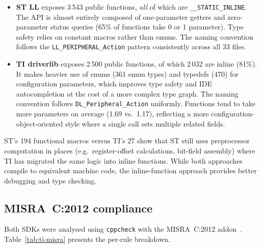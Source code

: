 \begin{itemize}
  \item \textbf{ST LL} exposes 3\,543 public functions, \emph{all} of which are
        \texttt{\_\_STATIC\_INLINE}. The API is almost entirely composed of one-parameter
        getters and zero-parameter status queries (65\% of functions take 0 or 1 parameter).
        Type safety relies on constant macros rather than enums. The naming convention
        follows the \texttt{LL\_PERIPHERAL\_Action} pattern consistently across all 33
        files.
  \item \textbf{TI driverlib} exposes 2\,500 public functions, of which 2\,032 are inline
        (81\%). It makes heavier use of enums (361 enum types) and typedefs (470) for
        configuration parameters, which improves type safety and IDE autocompletion at the
        cost of a more complex type graph. The naming convention follows
        \texttt{DL\_Peripheral\_Action} uniformly. Functions tend to take more parameters
        on average (1.69 vs.\ 1.17), reflecting a more configuration-object-oriented
        style where a single call sets multiple related fields.
\end{itemize}

ST's 194 functional macros versus TI's 27 show that ST still uses preprocessor computation
in places (e.g.\ register-offset calculations, bit-field assembly) where TI has migrated
the same logic into inline functions. While both approaches compile to equivalent machine
code, the inline-function approach provides better debugging and type checking.

\subsection{MISRA~C:2012 compliance}
\label{subsec:ti-misra}

Both SDKs were analysed using \texttt{cppcheck} with the MISRA~C:2012
addon~\cite{misra-c2012}. Table~\ref{tab:ti-misra} presents the per-rule breakdown.

